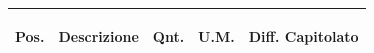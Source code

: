 \documentclass[a4paper]{article}
\begin{document}
                            \noindent\begin{tabular}{ | L{10mm} |  L{86mm} | L{12mm} | L{12mm} | L{16mm} | }
                            \hline
                            \vspace{2.5mm}
                            \begin{spacing}{0}
                              \textbf{Pos.}
                            \end{spacing} &
                            \vspace{2.5mm}
                            \begin{spacing}{0}
                              \textbf{Descrizione}
                            \end{spacing} &
                            \vspace{2.5mm}
                            \begin{spacing}{0}
                              \textbf{Qnt.}
                            \end{spacing} &
                            \vspace{2.5mm}
                            \begin{spacing}{0}
                              \textbf{U.M.}
                            \end{spacing} &
                            \vspace{2.5mm}
                            \begin{spacing}{0}
                              \textbf{Diff. Capitolato}
                            \end{spacing} \\
                            \hline
                         

\end{tabular}
\end{document}
